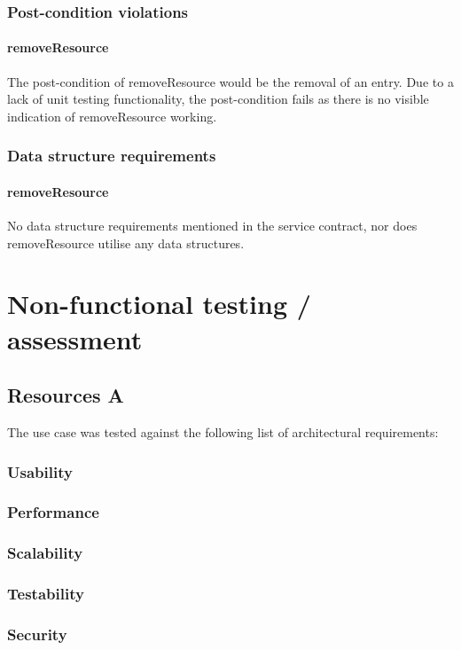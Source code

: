 \documentclass[a4paper]{article}
\begin{document}
\subsubsection {Post-condition violations}

\paragraph{removeResource}
The post-condition of removeResource would be the removal of an entry. Due to a lack of unit testing functionality, the post-condition fails as there is no visible indication of removeResource working.

\subsubsection {Data structure requirements}

\paragraph{removeResource}
No data structure requirements mentioned in the service contract, nor does removeResource utilise any data structures.

\section {Non-functional testing / assessment}
\subsection {Resources A}
The use case was tested against the following list of architectural requirements:
\subsubsection {Usability}
\subsubsection {Performance}
\subsubsection {Scalability}
\subsubsection {Testability}
\subsubsection {Security}
\end{document}
